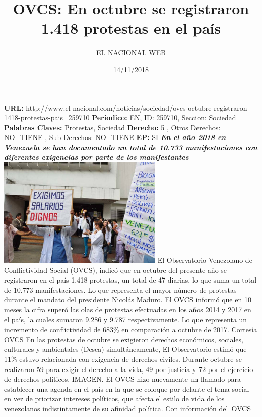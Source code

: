 \documentclass{article}%
\title{\textbf{OVCS: En octubre se registraron 1.418 protestas en el país}}%
\author{EL NACIONAL WEB}%
\date{14/11/2018}%
\begin{document}
%
\normalsize%
\maketitle%
\textbf{URL: }%
http://www.el{-}nacional.com/noticias/sociedad/ovcs{-}octubre{-}registraron{-}1418{-}protestas{-}pais\_259710\newline%
%
\textbf{Periodico: }%
EN, %
ID: %
259710, %
Seccion: %
Sociedad\newline%
%
\textbf{Palabras Claves: }%
Protestas, Sociedad\newline%
%
\textbf{Derecho: }%
5%
, Otros Derechos: %
NO\_TIENE%
, Sub Derechos: %
NO\_TIENE%
\newline%
%
\textbf{EP: }%
SI\newline%
\newline%
%
\textbf{\textit{En el año 2018 en Venezuela se han documentado un total de 10.733 manifestaciones con diferentes exigencias por parte de los manifestantes}}%
\newline%
\newline%
%
\includegraphics[width=300px]{184.jpg}%
\newline%
%
El Observatorio Venezolano de Conflictividad Social (OVCS), indicó que en octubre del presente año se registraron en el país 1.418 protestas, un total de 47 diarias, lo que suma un total de 10.773 manifestaciones. Lo que representa el mayor número de protestas durante el mandato del presidente Nicolás Maduro.%
\newline%
%
El OVCS informó que en 10 meses la cifra superó las olas de protestas efectuadas en los años 2014 y 2017 en el país, la cuales sumaron 9.286 y 9.787 respectivamente. Lo que representa un incremento de conflictividad de 683\% en comparación a octubre de 2017.%
\newline%
%
Cortesía OVCS%
\newline%
%
En las protestas de octubre se exigieron derechos económicos, sociales, culturales y ambientales (Desca) simultáneamente, El Observatorio estimó que 11\% estuvo relacionada con exigencia de derechos civiles. Durante octubre se realizaron 59 para exigir el derecho a la vida, 49 por justicia y 72 por el ejercicio de derechos políticos. IMAGEN.%
\newline%
%
El OVCS hizo nuevamente un llamado para establecer una agenda en el país en la que se coloque por delante el tema social en vez de priorizar intereses políticos, que afecta el estilo de vida de los venezolanos indistintamente de su afinidad política.%
\newline%
%
Con información del~OVCS%
\newline%
%
\end{document}
